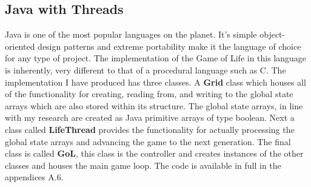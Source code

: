 \documentclass[11pt]{article} %
\begin{document}
\subsection{Java with Threads}
Java is one of the most popular languages on the planet. It's simple object-oriented design patterns and extreme portability make it the language of choice for any type of project. The implementation of the Game of Life in this language is inherently, very different to that of a procedural language such as C. The implementation I have produced has three classes. A {\bf Grid} class which houses all of the functionality for creating, reading from, and writing to the global state arrays which are also stored within its structure. The global state arrays, in line with my research are created as Java primitive arrays of type boolean. Next a class called {\bf LifeThread} provides the functionality for actually processing the global state arrays and advancing the game to the next generation. The final class is called {\bf GoL}, this class is the controller and creates instances of the other classes and houses the main game loop. The code is available in full in the appendices A.6.
\end{document}
